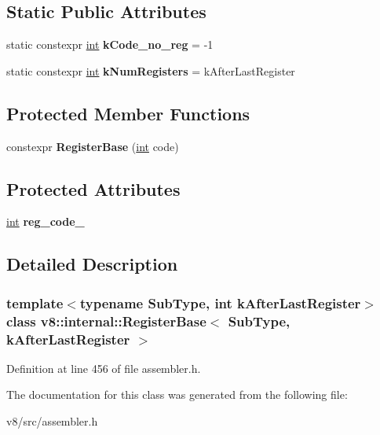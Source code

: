 \subsection*{Static Public Attributes}
\begin{DoxyCompactItemize}
\item 
\mbox{\label{classv8_1_1internal_1_1RegisterBase_aae3303a8531bf2f4951b7f1b88770782}} 
static constexpr \mbox{\hyperlink{classint}{int}} {\bfseries k\+Code\+\_\+no\+\_\+reg} = -\/1
\item 
\mbox{\label{classv8_1_1internal_1_1RegisterBase_aa75fc94873db2cd40533f9933e036fdb}} 
static constexpr \mbox{\hyperlink{classint}{int}} {\bfseries k\+Num\+Registers} = k\+After\+Last\+Register
\end{DoxyCompactItemize}
\subsection*{Protected Member Functions}
\begin{DoxyCompactItemize}
\item 
\mbox{\label{classv8_1_1internal_1_1RegisterBase_a350b07992e99cb2a59474c2ef4869441}} 
constexpr {\bfseries Register\+Base} (\mbox{\hyperlink{classint}{int}} code)
\end{DoxyCompactItemize}
\subsection*{Protected Attributes}
\begin{DoxyCompactItemize}
\item 
\mbox{\label{classv8_1_1internal_1_1RegisterBase_ae15927247b0c2cd047e1e4923788b981}} 
\mbox{\hyperlink{classint}{int}} {\bfseries reg\+\_\+code\+\_\+}
\end{DoxyCompactItemize}


\subsection{Detailed Description}
\subsubsection*{template$<$typename Sub\+Type, int k\+After\+Last\+Register$>$\newline
class v8\+::internal\+::\+Register\+Base$<$ Sub\+Type, k\+After\+Last\+Register $>$}



Definition at line 456 of file assembler.\+h.



The documentation for this class was generated from the following file\+:\begin{DoxyCompactItemize}
\item 
v8/src/assembler.\+h\end{DoxyCompactItemize}
